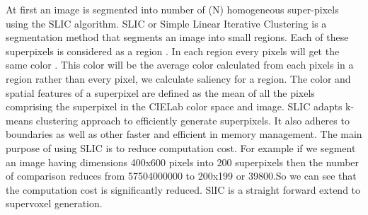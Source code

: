 At first an image is segmented into number of (N) homogeneous super-pixels using the SLIC algorithm\cite{achanta2012slic}. SLIC or Simple Linear Iterative Clustering is a segmentation method that segments an image into small regions. Each of these superpixels is considered as a region . In each region every pixels will get the same color . This color will be the average color calculated from each pixels in a region rather than every pixel, we calculate saliency for a region. The color and spatial features of a superpixel are defined as the mean of all the pixels comprising the superpixel in the CIELab color space and image. SLIC adapts k-means clustering approach to efficiently generate superpixels. It also adheres to boundaries as well as other faster and efficient in memory management.
The main purpose of using SLIC is to reduce computation cost. For example 
if we segment an image having dimensions 400x600 pixels into 200 superpixels then the number of comparison reduces from 57504000000 to 200x199 or 39800.So we can see that the computation cost is significantly reduced. SlIC is a straight forward extend to supervoxel generation.

